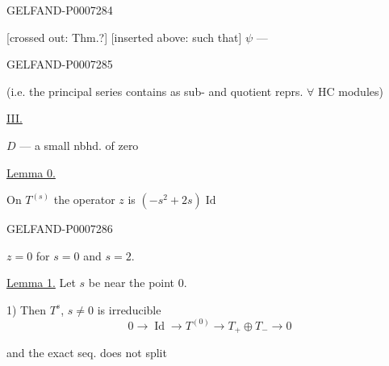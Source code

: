 \begin{GelfandAdjacentEvidence}{GELFAND-P000728}{4}


[crossed out: Thm.?] [inserted above: such that] \(\psi\) --- 
\end{GelfandAdjacentEvidence}
\begin{GelfandAdjacentEvidence}{GELFAND-P000728}{5}


(i.e. the principal series contains as sub- and quotient reprs. \(\forall\) HC modules)

\underline{III.}\quad {}

\(D\) --- a small nbhd. of zero

\underline{Lemma 0.}

On \(T^{(s)}\) the operator \(z\) is \((-s^2+2s)\operatorname{Id}\)
\end{GelfandAdjacentEvidence}
\begin{GelfandAdjacentEvidence}{GELFAND-P000728}{6}


\(z=0\) for \(s=0\) and \(s=2\).

\underline{Lemma 1.} Let \(s\) be near the point 0.

1) Then \(T^s\), \(s\ne 0\) is irreducible
\[
0\longrightarrow\operatorname{Id}\longrightarrow T^{(0)}
\longrightarrow T_+\oplus T_-\longrightarrow 0
\]
\end{GelfandAdjacentEvidence}

and the exact seq. does not split


